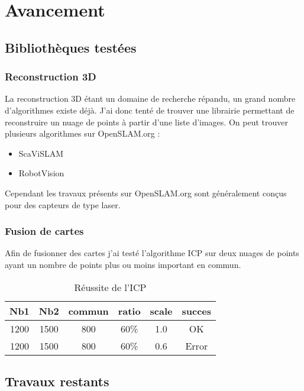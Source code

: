 \section{Avancement}

\subsection{Bibliothèques testées}

\subsubsection{Reconstruction 3D}

La reconstruction 3D étant un domaine de recherche répandu, un grand nombre d'algorithmes existe déjà. J'ai donc tenté de trouver une librairie permettant de reconstruire un nuage de points à partir d'une liste d'images.
On peut trouver plusieurs algorithmes sur OpenSLAM.org :
\begin{itemize}
  \item ScaViSLAM
  \item RobotVision
\end{itemize}

Cependant les travaux présents sur OpenSLAM.org sont généralement conçus pour des capteurs de type laser.

\subsubsection{Fusion de cartes}

Afin de fusionner des cartes j'ai testé l'algorithme ICP sur deux nuages de points ayant un nombre de points plus ou moins important en commun.

\begin{table}[h]
  \begin{center}
    \begin{tabular}{|c|c|c|c|c|c|}
    \hline
    Nb1 & Nb2 & commun & ratio & scale & succes \\
    \hline
    1200 & 1500 & 800 & 60\% & 1.0 & OK \\
    1200 & 1500 & 800 & 60\% & 0.6 & Error \\
    \hline
    \end{tabular}
  \caption{Réussite de l'ICP}
  \end{center}
\end{table}


\subsection{Travaux restants}

